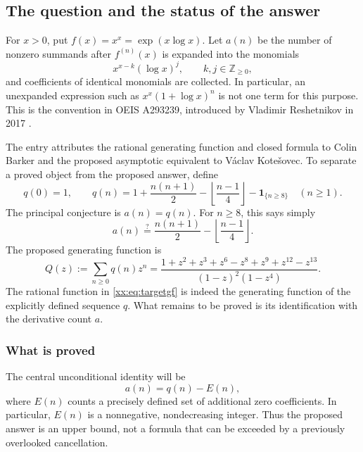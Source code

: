\documentclass[11pt,a4paper]{article}
\numberwithin{equation}{section}
\theoremstyle{definition}
\theoremstyle{remark}
\theoremstyle{plain}
\newcommand{\Z}{\mathbb Z}
\newcommand{\ind}[1]{\mathbf{1}_{\{#1\}}}
\begin{document}
\subsection{The question and the status of the answer}

For $x>0$, put $f(x)=x^x=\exp(x\log x)$. Let $a(n)$ be the number of nonzero
summands after $f^{(n)}(x)$ is expanded into the monomials
\begin{equation}\label{xx:eq:monomials}
 x^{x-k}(\log x)^j,\qquad k,j\in\Z_{\ge0},
\end{equation}
and coefficients of identical monomials are collected. In particular, an
unexpanded expression such as $x^x(1+\log x)^n$ is not one term for this
purpose. This is the convention in OEIS A293239, introduced by Vladimir
Reshetnikov in 2017 \cite{oeis293239}.

The entry attributes the rational generating function and closed formula to
Colin Barker and the proposed asymptotic equivalent to V\'aclav
Kote\v{s}ovec. To separate a proved object from the proposed answer, define
\begin{equation}\label{xx:eq:q}
 q(0)=1,\qquad
 q(n)=1+\frac{n(n+1)}2-\left\lfloor\frac{n-1}{4}\right\rfloor
             -\ind{n\ge8}\quad(n\ge1).
\end{equation}
The principal conjecture is $a(n)=q(n)$. For $n\ge8$, this says simply
\begin{equation}\label{xx:eq:eventual}
 a(n)\stackrel{?}{=}\frac{n(n+1)}2-\left\lfloor\frac{n-1}{4}\right\rfloor.
\end{equation}
The proposed generating function is
\begin{equation}\label{xx:eq:targetgf}
 Q(z):=\sum_{n\ge0}q(n)z^n
 =\frac{1+z^2+z^3+z^6-z^8+z^9+z^{12}-z^{13}}
 {(1-z)^2(1-z^4)}.
\end{equation}
The rational function in \eqref{xx:eq:targetgf} is indeed the generating function
of the explicitly defined sequence $q$. What remains to be proved is its
identification with the derivative count $a$.

\subsubsection{What is proved}
The central unconditional identity will be
\begin{equation}\label{xx:eq:introdefect}
 a(n)=q(n)-E(n),
\end{equation}
where $E(n)$ counts a precisely defined set of additional zero coefficients.
In particular, $E(n)$ is a nonnegative, nondecreasing integer. Thus the
proposed answer is an upper bound, not a formula that can be exceeded by a
previously overlooked cancellation.
\end{document}

